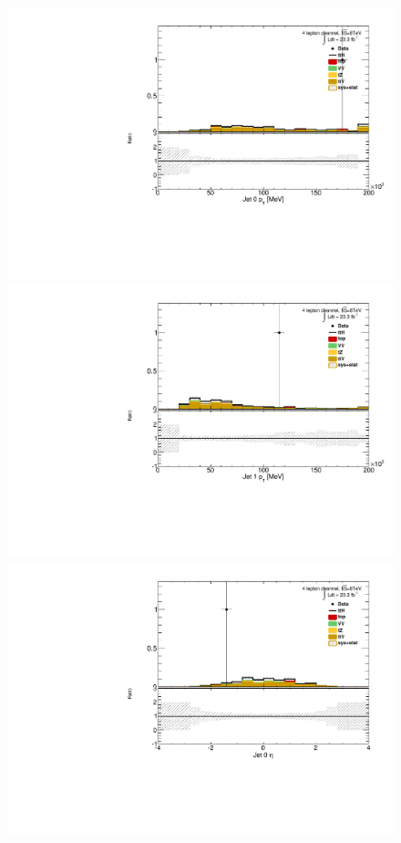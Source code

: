 \begin{figure}[!htbp]
  \begin{minipage}[h]{0.5\textwidth}
    \centering \includegraphics[width=\textwidth]{figs/results/plotCand_4lep_Jet0Pt}
  \end{minipage}\hfill
  \begin{minipage}[h]{0.5\textwidth}
    \centering \includegraphics[width=\textwidth]{figs/results/plotCand_4lep_Jet1Pt}
  \end{minipage}\hfill
  \begin{minipage}[h]{0.5\textwidth}
    \centering \includegraphics[width=\textwidth]{figs/results/plotCand_4lep_Jet0Eta}

\end{minipage}
\end{figure}
